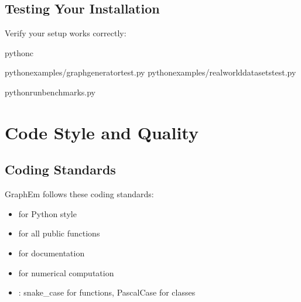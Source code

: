 \documentclass[letterpaper,10pt,english]{sphinxmanual}
\begin{document}
\subsection{Testing Your Installation}
\label{\detokenize{contributing:testing-your-installation}}
\sphinxAtStartPar
Verify your setup works correctly:

\begin{sphinxVerbatim}[commandchars=\\\{\}]
python\PYGZhy{}c

pythonexamples/graph\PYGZus{}generator\PYGZus{}test.py
pythonexamples/real\PYGZus{}world\PYGZus{}datasets\PYGZus{}test.py

pythonrun\PYGZus{}benchmarks.py
\end{sphinxVerbatim}


\section{Code Style and Quality}
\label{\detokenize{contributing:code-style-and-quality}}

\subsection{Coding Standards}
\label{\detokenize{contributing:coding-standards}}
\sphinxAtStartPar
GraphEm follows these coding standards:
\begin{itemize}
\item {} 
\sphinxAtStartPar
{} for Python style

\item {} 
\sphinxAtStartPar
{} for all public functions

\item {} 
\sphinxAtStartPar
{} for documentation

\item {} 
\sphinxAtStartPar
{} for numerical computation

\item {} 
\sphinxAtStartPar
{}: snake\_case for functions, PascalCase for classes

\end{itemize}
\end{document}

